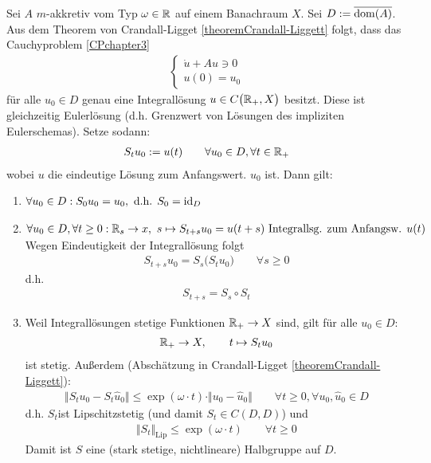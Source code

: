 \begin{beispiel}\enter
	Sei $A$ $m$-akkretiv vom Typ $\omega\in\mathbb{R}$ auf einem Banachraum $X$. Sei $D:=\overline{\operatorname{dom}(A)}$. 
	Aus dem Theorem von Crandall-Ligget \ref{theoremCrandall-Liggett} folgt, dass das Cauchyproblem \eqref{CPchapter3}
	\begin{align*}
		\left\lbrace\begin{array}{r}
			\dot{u}+Au\ni 0\\
			u(0)=u_0
		\end{array}\right.
	\end{align*}
	für alle $u_0\in D$ genau eine Integrallösung $u\in C\big(\mathbb{R}_+,X\big)$ besitzt. 
	Diese ist gleichzeitig Eulerlösung (d.h. Grenzwert von Lösungen des impliziten Eulerschemas). 
	Setze sodann:
	\begin{align*}
		S_t u_0:=u(t)\qquad\forall u_0\in D,\forall t\in\mathbb{R}_+
	\end{align*}
	wobei $u$ die eindeutige Lösung zum Anfangswert. $u_0$ ist. 
	Dann gilt:
	\begin{enumerate}[label=(\roman*)]
		\item $\begin{aligned}
			\forall u_0\in D:S_0 u_0=u_0,\text{ d.h. }S_0=\operatorname{id}_D
		\end{aligned}$
		\item $\begin{aligned}
			\forall u_0\in D,\forall t\geq 0:\mathbb{R}_s\to x,~
			s\mapsto S_{t+s} u_0=u(t+s)\text{ Integrallsg. zum Anfangsw. }u(t)
		\end{aligned}$\\
		Wegen Eindeutigkeit der Integrallösung folgt
		\begin{align*}
			S_{t+s}u_0=S_s\big( S_t u_0\big)\qquad\forall s\geq0
		\end{align*}
		d.h.
		\begin{align*}
			S_{t+s}=S_s\circ S_t
		\end{align*}
		\item Weil Integrallösungen stetige Funktionen $\mathbb{R}_+\to X$ sind, gilt für alle $u_0\in D$:
		\begin{align*}
			\mathbb{R}_+\to X,\qquad t\mapsto S_t u_0
		\end{align*}
		ist stetig. Außerdem (Abschätzung in Crandall-Ligget \ref{theoremCrandall-Liggett}):
		\begin{align*}
			\big\Vert S_t u_0-S_t\hat{u}_0\big\Vert\leq\exp(\omega\cdot t)\cdot\Vert u_0-\hat{u}_0\big\Vert\qquad\forall t\geq0,\forall u_0,\hat{u}_0\in D
		\end{align*}
		d.h. $S_t$ist Lipschitzstetig (und damit $S_t\in C(D,D)$) und 
		\begin{align*}
			\big\Vert S_t\big\Vert_{\text{Lip}}\leq\exp(\omega\cdot t)\qquad\forall t\geq0
		\end{align*}
		Damit ist $S$ eine (stark stetige, nichtlineare) Halbgruppe auf $D$.
	\end{enumerate}
\end{beispiel}

